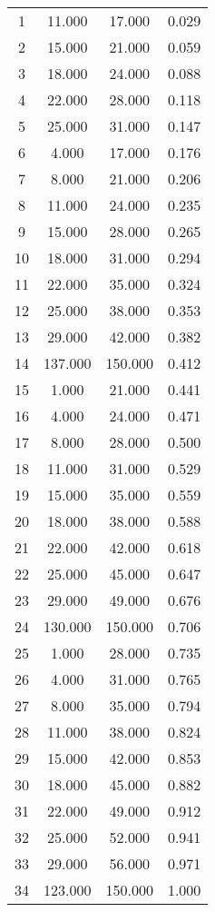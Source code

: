 % 
\begin{tabular}{cccc}
  \hline
  \hline
1 & 11.000 & 17.000 & 0.029 \\ 
  2 & 15.000 & 21.000 & 0.059 \\ 
  3 & 18.000 & 24.000 & 0.088 \\ 
  4 & 22.000 & 28.000 & 0.118 \\ 
  5 & 25.000 & 31.000 & 0.147 \\ 
  6 & 4.000 & 17.000 & 0.176 \\ 
  7 & 8.000 & 21.000 & 0.206 \\ 
  8 & 11.000 & 24.000 & 0.235 \\ 
  9 & 15.000 & 28.000 & 0.265 \\ 
  10 & 18.000 & 31.000 & 0.294 \\ 
  11 & 22.000 & 35.000 & 0.324 \\ 
  12 & 25.000 & 38.000 & 0.353 \\ 
  13 & 29.000 & 42.000 & 0.382 \\ 
  14 & 137.000 & 150.000 & 0.412 \\ 
  15 & 1.000 & 21.000 & 0.441 \\ 
  16 & 4.000 & 24.000 & 0.471 \\ 
  17 & 8.000 & 28.000 & 0.500 \\ 
  18 & 11.000 & 31.000 & 0.529 \\ 
  19 & 15.000 & 35.000 & 0.559 \\ 
  20 & 18.000 & 38.000 & 0.588 \\ 
  21 & 22.000 & 42.000 & 0.618 \\ 
  22 & 25.000 & 45.000 & 0.647 \\ 
  23 & 29.000 & 49.000 & 0.676 \\ 
  24 & 130.000 & 150.000 & 0.706 \\ 
  25 & 1.000 & 28.000 & 0.735 \\ 
  26 & 4.000 & 31.000 & 0.765 \\ 
  27 & 8.000 & 35.000 & 0.794 \\ 
  28 & 11.000 & 38.000 & 0.824 \\ 
  29 & 15.000 & 42.000 & 0.853 \\ 
  30 & 18.000 & 45.000 & 0.882 \\ 
  31 & 22.000 & 49.000 & 0.912 \\ 
  32 & 25.000 & 52.000 & 0.941 \\ 
  33 & 29.000 & 56.000 & 0.971 \\ 
  34 & 123.000 & 150.000 & 1.000 \\ 
   \hline
\end{tabular}
